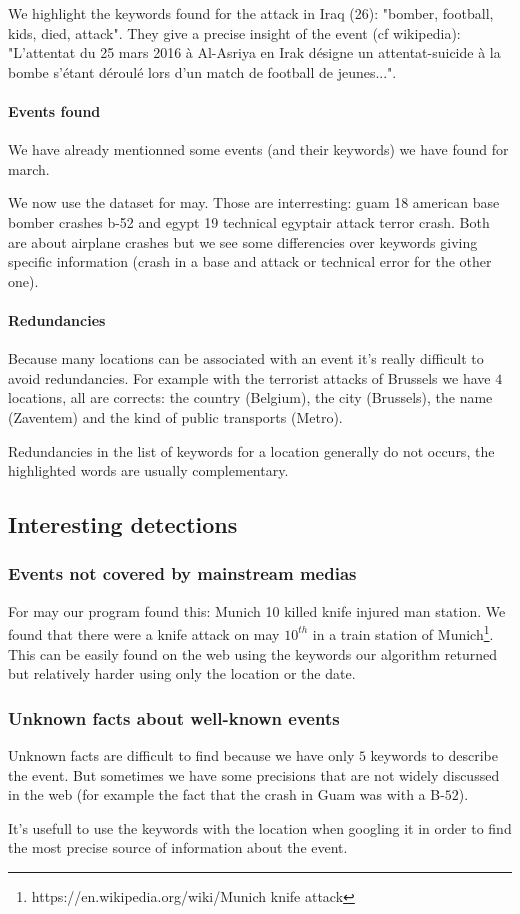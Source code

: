 \documentclass[a4paper]{article}
\begin{document}
We highlight the keywords found for the attack in Iraq (26): "bomber, football, kids, died, attack". They give a precise insight of the event (cf wikipedia): "L'attentat du 25 mars 2016 à Al-Asriya en Irak désigne un attentat-suicide à la bombe s'étant déroulé lors d'un match de football de jeunes...".

\paragraph{Events found}

We have already mentionned some events (and their keywords) we have found for march.

We now use the dataset for may.
Those are interresting: guam 18 american base bomber crashes b-52 and egypt 19 technical egyptair attack terror crash.
Both are about airplane crashes but we see some differencies over keywords giving specific information (crash in a base and attack or technical error for the other one).

\paragraph{Redundancies}

Because many locations can be associated with an event it's really difficult to avoid redundancies.
For example with the terrorist attacks of Brussels we have $4$ locations, all are corrects: the country (Belgium), the city (Brussels), the name (Zaventem) and the kind of public transports (Metro).

Redundancies in the list of keywords for a location generally do not occurs, the highlighted words are usually complementary.

\subsection{Interesting detections}

\subsubsection{Events not covered by mainstream medias}

For may our program found this: Munich 10 killed knife injured man station.
We found that there were a knife attack on may $10^{th}$ in a train station of Munich\footnote{https://en.wikipedia.org/wiki/Munich knife attack}. This can be easily found on the web using the keywords our algorithm returned but relatively harder using only the location or the date.

\subsubsection{Unknown facts about well-known events}

Unknown facts are difficult to find because we have only $5$ keywords to describe the event. But sometimes we have some precisions that are not widely discussed in the web (for example the fact that the crash in Guam was with a B-$52$).

It's usefull to use the keywords with the location when googling it in order to find the most precise source of information about the event.
\end{document}
